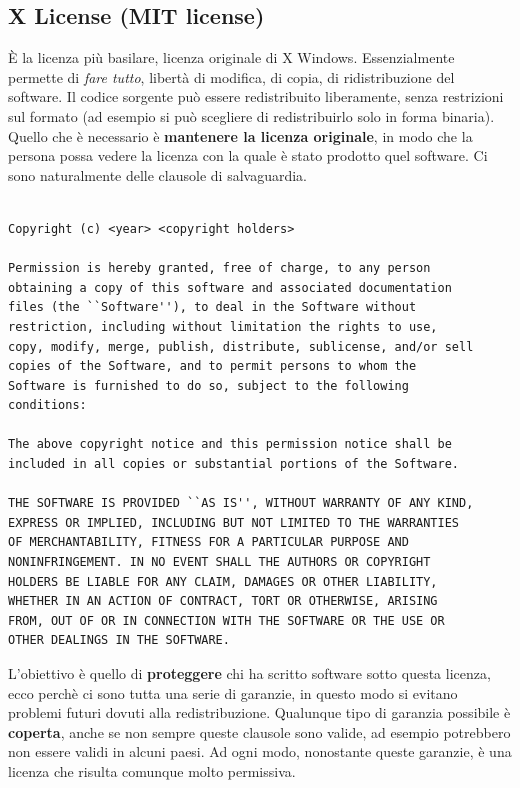 \subsection{X License (MIT license)}

È la licenza più basilare, licenza originale di X Windows. Essenzialmente permette di \textit{fare tutto}, libertà di modifica, di copia, di ridistribuzione del software. Il codice sorgente può essere redistribuito liberamente, senza restrizioni sul formato (ad esempio si può scegliere di redistribuirlo solo in forma binaria). Quello che è necessario è \textbf{mantenere la licenza originale}, in modo che la persona possa vedere la licenza con la quale è stato prodotto quel software. Ci sono naturalmente delle clausole di salvaguardia. 	

\begin{lstlisting}[caption=Licenza MIT]

Copyright (c) <year> <copyright holders>

Permission is hereby granted, free of charge, to any person
obtaining a copy of this software and associated documentation
files (the ``Software''), to deal in the Software without
restriction, including without limitation the rights to use,
copy, modify, merge, publish, distribute, sublicense, and/or sell
copies of the Software, and to permit persons to whom the
Software is furnished to do so, subject to the following
conditions:

The above copyright notice and this permission notice shall be
included in all copies or substantial portions of the Software.

THE SOFTWARE IS PROVIDED ``AS IS'', WITHOUT WARRANTY OF ANY KIND,
EXPRESS OR IMPLIED, INCLUDING BUT NOT LIMITED TO THE WARRANTIES
OF MERCHANTABILITY, FITNESS FOR A PARTICULAR PURPOSE AND
NONINFRINGEMENT. IN NO EVENT SHALL THE AUTHORS OR COPYRIGHT
HOLDERS BE LIABLE FOR ANY CLAIM, DAMAGES OR OTHER LIABILITY,
WHETHER IN AN ACTION OF CONTRACT, TORT OR OTHERWISE, ARISING
FROM, OUT OF OR IN CONNECTION WITH THE SOFTWARE OR THE USE OR
OTHER DEALINGS IN THE SOFTWARE.

\end{lstlisting}

L'obiettivo è quello di \textbf{proteggere} chi ha scritto software sotto questa licenza, ecco perchè ci sono tutta una serie di garanzie, in questo modo si evitano problemi futuri dovuti alla redistribuzione. Qualunque tipo di garanzia possibile è \textbf{coperta}, anche se non sempre queste clausole sono valide, ad esempio potrebbero non essere validi in alcuni paesi. Ad ogni modo, nonostante queste garanzie, è una licenza che risulta comunque molto permissiva. 

